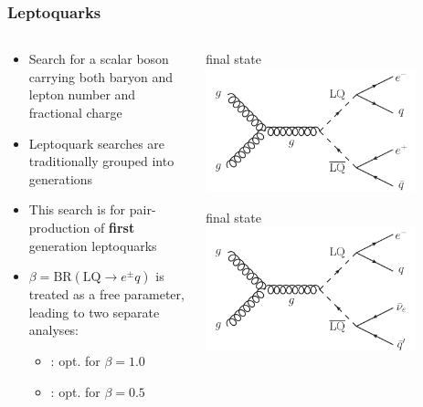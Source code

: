 \documentclass[bigger]{beamer}
\providecommand{\alert}[1]{\textbf{#1}}
\begin{document}
\begin{frame}
\frametitle{Leptoquarks}
\label{sec-1-1-2}
\begin{columns}
\begin{column}{0.6\textwidth}
\label{sec-1-1-2-1}

\footnotesize
\begin{itemize}
\item Search for a scalar boson carrying both baryon and lepton number and fractional charge
\item Leptoquark searches are traditionally grouped into generations
\item This search is for pair-production of \alert{first} generation leptoquarks
\item $\beta = \text{BR}(\text{LQ} \rightarrow e^{\pm}q)$ is treated as a free parameter,
leading to two separate analyses:
\begin{itemize}
\item \eejj: opt. for $\beta = 1.0$
\item \enujj: opt. for $\beta = 0.5$
\end{itemize}
\end{itemize}
\normalsize
\end{column}
\begin{column}{0.5\textwidth}
\label{sec-1-1-2-2}
\label{sec-1-1-2-2-1}

\centering
\eejj final state
\includegraphics[width=0.8\textwidth]{fig/feynman/LQ_pair_decay_eejj.pdf}
\label{sec-1-1-2-2-2}

\centering
\enujj final state
\includegraphics[width=0.8\textwidth]{fig/feynman/LQ_pair_decay_enujj.pdf}
\end{column}
\end{columns}
\end{frame}
\end{document}
